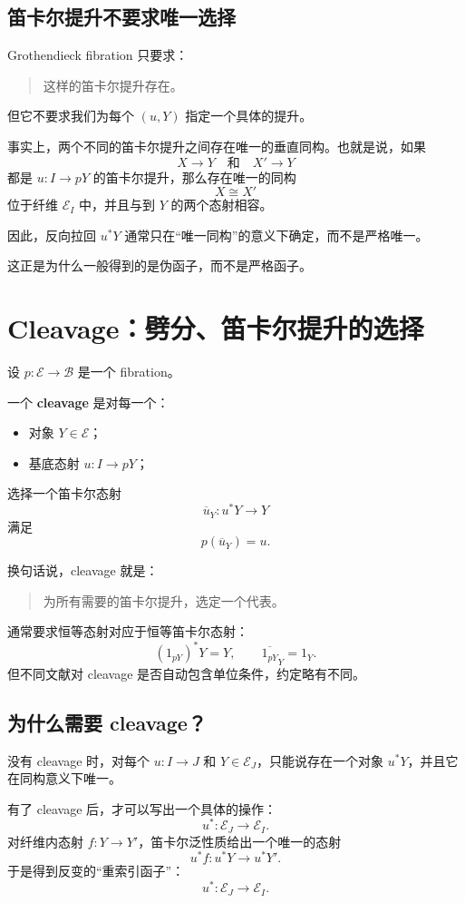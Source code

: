 \documentclass[12pt,a4paper]{article}
\begin{document}
\subsection{笛卡尔提升不要求唯一选择}

Grothendieck fibration 只要求：
\begin{quote}
这样的笛卡尔提升存在。
\end{quote}
但它不要求我们为每个 \((u,Y)\) 指定一个具体的提升。

事实上，两个不同的笛卡尔提升之间存在唯一的垂直同构。也就是说，如果
\[
X\to Y
\quad\text{和}\quad
X'\to Y
\]
都是 \(u:I\to pY\) 的笛卡尔提升，那么存在唯一的同构
\[
X\cong X'
\]
位于纤维 \(\mathcal{E}_I\) 中，并且与到 \(Y\) 的两个态射相容。

因此，反向拉回 \(u^*Y\) 通常只在“唯一同构”的意义下确定，而不是严格唯一。

这正是为什么一般得到的是伪函子，而不是严格函子。

\section{Cleavage：劈分、笛卡尔提升的选择}

设 \(p:\mathcal{E}\to\mathcal{B}\) 是一个 fibration。

一个 \textbf{cleavage} 是对每一个：
\begin{itemize}
  \item 对象 \(Y\in\mathcal{E}\)；
  \item 基底态射 \(u:I\to pY\)；
\end{itemize}
选择一个笛卡尔态射
\[
\overline{u}_Y:u^*Y\to Y
\]
满足
\[
p(\overline{u}_Y)=u.
\]

换句话说，cleavage 就是：
\begin{quote}
为所有需要的笛卡尔提升，选定一个代表。
\end{quote}

通常要求恒等态射对应于恒等笛卡尔态射：
\[
(1_{pY})^*Y=Y,
\qquad
\overline{1_{pY}}_Y=1_Y.
\]
但不同文献对 cleavage 是否自动包含单位条件，约定略有不同。

\subsection{为什么需要 cleavage？}

没有 cleavage 时，对每个 \(u:I\to J\) 和 \(Y\in\mathcal{E}_J\)，只能说存在一个对象 \(u^*Y\)，并且它在同构意义下唯一。

有了 cleavage 后，才可以写出一个具体的操作：
\[
u^*:\mathcal{E}_J\to\mathcal{E}_I.
\]
对纤维内态射 \(f:Y\to Y'\)，笛卡尔泛性质给出一个唯一的态射
\[
u^*f:u^*Y\to u^*Y'.
\]
于是得到反变的“重索引函子”：
\[
u^*:\mathcal{E}_J\to\mathcal{E}_I.
\]
\end{document}
